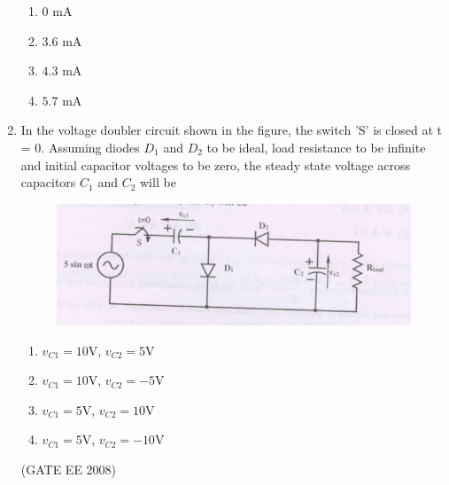 \documentclass[journal,12pt,onecolumn]{IEEEtran}
\theoremstyle{remark}
\begin{document}
\begin{enumerate}[start=1, label=Q.\arabic*]
\begin{multicols}{4}
\begin{enumerate}[label=(\Alph*)]
    \item $0$ mA
    \item $3.6$ mA
    \item $4.3$ mA
    \item $5.7$ mA
\end{enumerate}
\end{multicols}


\item In the voltage doubler circuit shown in the figure, the switch 'S' is closed at t = 0. Assuming diodes $D_1$ and $D_2$ to be ideal, load resistance to be infinite and initial capacitor voltages to be zero, the steady state voltage across capacitors $C_1$ and $C_2$ will be

\begin{figure}[H]
    \centering
    \includegraphics[width=\columnwidth]{Fig/q41.png}
\end{figure}

\begin{multicols}{2}
\begin{enumerate}[label=(\Alph*)]
    \item $v_{C1}=10$V, $v_{C2}=5$V
    \item $v_{C1}=10$V, $v_{C2}=-5$V
    \item $v_{C1}=5$V, $v_{C2}=10$V
    \item $v_{C1}=5$V, $v_{C2}=-10$V
\end{enumerate}
\end{multicols}
\hfill (GATE EE 2008)



\end{enumerate}
\end{document}
